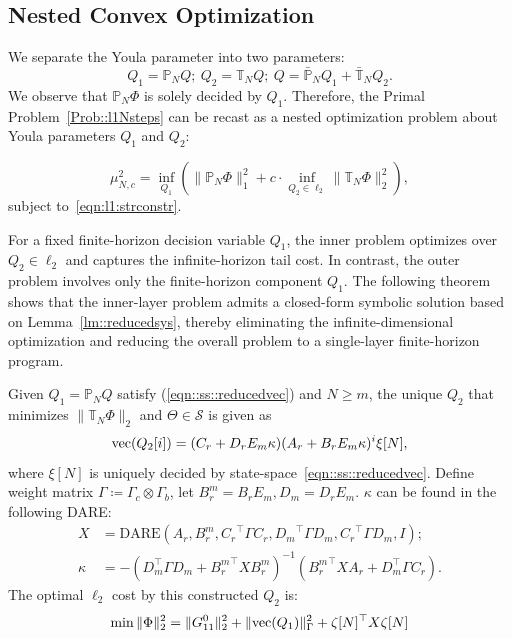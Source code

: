 \subsection{Nested Convex Optimization}



We separate the Youla parameter into two parameters:
\begin{equation}
    Q_1 =  \mathbb{P}_{N}Q;\ Q_2 = \mathbb{T}_{N}Q;\ Q = \bar{\mathbb{P}}_{N} Q_1 + \bar{\mathbb{T}}_{N} Q_2.
\end{equation}
We observe that \(\mathbb{P}_{N}\Phi\) is solely decided by \(Q_1\).
Therefore, the Primal Problem~\ref{Prob::l1Nsteps} can be recast as a nested optimization problem about Youla parameters \(Q_1\) and \(Q_2\):
\begin{opt}
\[
\mu_{N,c}^2 =\underset{Q_1}{\inf} \left(\|\mathbb{P}_{N} \Phi\|_1^2 + c\cdot \underset{Q_2\in \ell_2}{\inf} \|\mathbb{T}_{N} \Phi\|_2^2 \right),
\]
subject to~\eqref{eqn:l1:strconstr}.
\end{opt}
For a fixed finite-horizon decision variable \(Q_1\), the inner problem optimizes over \(Q_2 \in \ell_2\) and captures the infinite-horizon tail cost. In contrast, the outer problem involves only the finite-horizon component \(Q_1\). The following theorem shows that the inner-layer problem admits a closed-form symbolic solution based on Lemma~\ref{lm::reducedsys}, thereby eliminating the infinite-dimensional optimization and reducing the overall problem to a single-layer finite-horizon program.
\begin{thm}\label{thm::tailoptimizer}
Given \(Q_1 = \mathbb{P}_N Q\) satisfy (\ref{eqn::ss::reducedvec}) and \(N \geq m\), the unique \(Q_2\) that minimizes \( \|\mathbb{T}_{N} \Phi\|_2\) and \(\Theta\in \mathcal{S}\) is given as
\[
{\mathrm{vec}}(Q_2[i]) = (C_r + D_r E_m \kappa) (A_r + B_r E_m \kappa)^{i} \xi[N],
\]
where \(\xi[N]\) is uniquely decided by state-space~\eqref{eqn::ss::reducedvec}. Define weight matrix \(\Gamma \coloneqq \Gamma_c \otimes \Gamma_b \), let \(B_r^m = B_r E_m, D_m = D_r E_m\). \(\kappa\) can be found in the following DARE:
\begin{align*}
    X &= \mathrm{DARE}(A_r, B_r^m, {C_r}^\top \Gamma {C_r}, {D_m}^\top\Gamma D_m,{C_r}^\top \Gamma {D_m},I);\ \\
    \kappa &= -(D_{m}^\top\Gamma D_m + {B_r^m}^\top X{B_r^m})^{-1} ({B_r^m}^\top X A_r +D_{m}^\top\Gamma C_r).
\end{align*}
The optimal \(\ell_2\) cost by this constructed \(Q_2\) is:
\[
\min \|\Phi\|_2^2 =  \|G_{11}^0\|_2^2 + \|{\mathrm{vec}}(Q_1)\|_\Gamma^2 + \zeta[N]^\top X \zeta[N]
\]
\end{thm}
